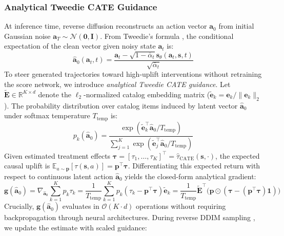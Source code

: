 \documentclass[preprint,12pt,3p]{elsarticle}
\begin{document}
\subsubsection{Analytical Tweedie CATE Guidance}
At inference time, reverse diffusion reconstructs an action vector $\mathbf{a}_0$ from initial Gaussian noise $\mathbf{a}_T \sim \mathcal{N}(\mathbf{0}, \mathbf{I})$. From Tweedie's formula \cite{efron2011tweedie}, the conditional expectation of the clean vector given noisy state $\mathbf{a}_t$ is:
\begin{equation}
\hat{\mathbf{a}}_0(\mathbf{a}_t, t) = \frac{\mathbf{a}_t - \sqrt{1 - \bar{\alpha}_t} \mathbf{s}_\theta(\mathbf{a}_t, \mathbf{s}, t)}{\sqrt{\bar{\alpha}_t}}
\end{equation}
To steer generated trajectories toward high-uplift interventions without retraining the score network, we introduce \textit{analytical Tweedie CATE guidance}. Let $\tilde{\mathbf{E}} \in \mathbb{R}^{K \times d}$ denote the $\ell_2$-normalized catalog embedding matrix ($\tilde{\mathbf{e}}_k = \mathbf{e}_k / \|\mathbf{e}_k\|_2$). The probability distribution over catalog items induced by latent vector $\hat{\mathbf{a}}_0$ under softmax temperature $T_{\mathrm{temp}}$ is:
\begin{equation}
p_k(\hat{\mathbf{a}}_0) = \frac{\exp\left( \tilde{\mathbf{e}}_k^\top \hat{\mathbf{a}}_0 / T_{\mathrm{temp}} \right)}{\sum_{j=1}^K \exp\left( \tilde{\mathbf{e}}_j^\top \hat{\mathbf{a}}_0 / T_{\mathrm{temp}} \right)}
\end{equation}
Given estimated treatment effects $\boldsymbol{\tau} = [\tau_1, \dots, \tau_K]^\top = \hat{\tau}_{\mathrm{CATE}}(\mathbf{s}, \cdot)$, the expected causal uplift is $\mathbb{E}_{a \sim \mathbf{p}}[\tau(\mathbf{s}, a)] = \mathbf{p}^\top \boldsymbol{\tau}$. Differentiating this expected return with respect to continuous latent action $\hat{\mathbf{a}}_0$ yields the closed-form analytical gradient:
\begin{equation}
\mathbf{g}(\hat{\mathbf{a}}_0) = \nabla_{\hat{\mathbf{a}}_0} \sum_{k=1}^K p_k \tau_k = \frac{1}{T_{\mathrm{temp}}} \sum_{k=1}^K p_k (\tau_k - \mathbf{p}^\top \boldsymbol{\tau}) \tilde{\mathbf{e}}_k = \frac{1}{T_{\mathrm{temp}}} \tilde{\mathbf{E}}^\top \Big( \mathbf{p} \odot (\boldsymbol{\tau} - (\mathbf{p}^\top \boldsymbol{\tau})\mathbf{1}) \Big)
\end{equation}
Crucially, $\mathbf{g}(\hat{\mathbf{a}}_0)$ evaluates in $\mathcal{O}(K \cdot d)$ operations without requiring backpropagation through neural architectures. During reverse DDIM sampling \cite{song2020denoising}, we update the estimate with scaled guidance:
\end{document}
